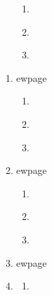 \documentclass[12pt]{article}
\begin{document}
  \begin{enumerate}

    \item \textit{}

    \begin{enumerate}
      \item \textit{}



      \item \textit{}



      \item \textit{}



    \end{enumerate}


    
ewpage
    \item \textit{}

    \begin{enumerate}
      \item \textit{}



      \item \textit{}



      \item \textit{}



    \end{enumerate}


    
ewpage
    \item \textit{}

    \begin{enumerate}
      \item \textit{}



      \item \textit{}



      \item \textit{}



    \end{enumerate}


    
ewpage
    \item \textit{}

    \begin{enumerate}
      \item \textit{}




\end{enumerate}
\end{enumerate}
\end{document}
